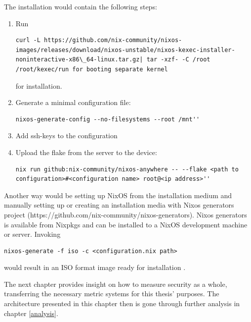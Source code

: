 The installation would contain the following steps:
\begin{enumerate}
\item Run
\begin{lstlisting}
curl -L https://github.com/nix-community/nixos-images/releases/download/nixos-unstable/nixos-kexec-installer-noninteractive-x86\_64-linux.tar.gz| tar -xzf- -C /root /root/kexec/run for booting separate kernel
\end{lstlisting}
for installation.
\item Generate a minimal configuration file:
\begin{lstlisting}
nixos-generate-config --no-filesystems --root /mnt''
\end{lstlisting}
\item Add ssh-keys to the configuration
\item Upload the flake from the server to the device:
\begin{lstlisting}
nix run github:nix-community/nixos-anywhere -- --flake <path to configuration>#<configuration name> root@<ip address>''
\end{lstlisting}
\end{enumerate}
Another way would be setting up NixOS from the installation medium and
manually setting up or creating an installation media with Nixos
generators project
(https://github.com/nix-community/nixos-generators). Nixos generators
is available from Nixpkgs and can be installed to a NixOS
development machine or server. Invoking
\begin{lstlisting}
nixos-generate -f iso -c <configuration.nix path>
\end{lstlisting}
would result in an ISO format image ready for
installation \cite{githubGitHubNixcommunitynixosanywhere}.

The next chapter provides insight on how to measure security as a
whole, transferring the necessary metric systems for this thesis'
purposes. The architecture presented in this chapter then is gone
through further analysis in chapter \ref{analysis}.
